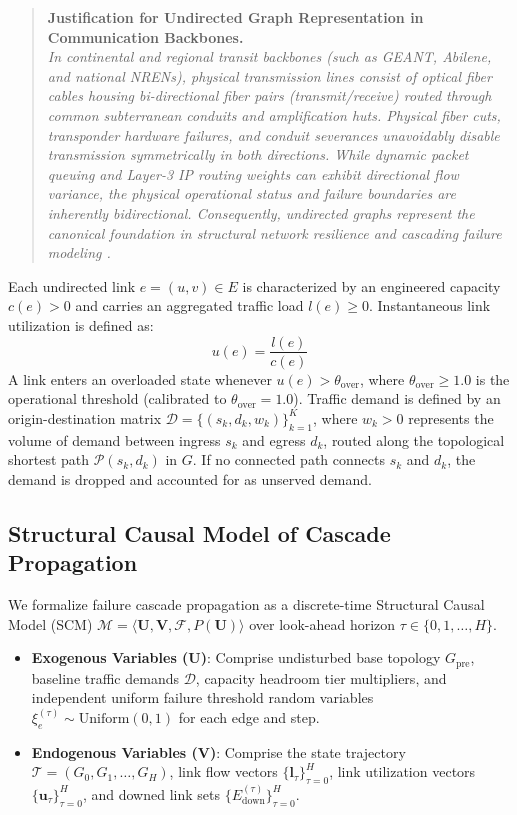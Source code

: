 \documentclass[pdflatex,sn-mathphys-num]{sn-jnl}
\theoremstyle{thmstyleone}
\theoremstyle{thmstyletwo}
\theoremstyle{thmstylethree}
\begin{document}
\begin{quote}
\textbf{Justification for Undirected Graph Representation in Communication Backbones.}\\
\textit{In continental and regional transit backbones (such as GEANT, Abilene, and national NRENs), physical transmission lines consist of optical fiber cables housing bi-directional fiber pairs (transmit/receive) routed through common subterranean conduits and amplification huts. Physical fiber cuts, transponder hardware failures, and conduit severances unavoidably disable transmission symmetrically in both directions. While dynamic packet queuing and Layer-3 IP routing weights can exhibit directional flow variance, the physical operational status and failure boundaries are inherently bidirectional. Consequently, undirected graphs represent the canonical foundation in structural network resilience and cascading failure modeling \cite{albert2000error,motter2002cascade,crucitti2004model}.}
\end{quote}

Each undirected link $e = (u, v) \in E$ is characterized by an engineered capacity $c(e) > 0$ and carries an aggregated traffic load $l(e) \ge 0$. Instantaneous link utilization is defined as:
\begin{equation}
u(e) = \frac{l(e)}{c(e)}
\end{equation}
A link enters an overloaded state whenever $u(e) > \theta_{\mathrm{over}}$, where $\theta_{\mathrm{over}} \ge 1.0$ is the operational threshold (calibrated to $\theta_{\mathrm{over}} = 1.0$). Traffic demand is defined by an origin-destination matrix $\mathcal{D} = \{(s_k, d_k, w_k)\}_{k=1}^K$, where $w_k > 0$ represents the volume of demand between ingress $s_k$ and egress $d_k$, routed along the topological shortest path $\mathcal{P}(s_k, d_k)$ in $G$. If no connected path connects $s_k$ and $d_k$, the demand is dropped and accounted for as unserved demand.

\subsection{Structural Causal Model of Cascade Propagation}
We formalize failure cascade propagation as a discrete-time Structural Causal Model (SCM) \cite{pearl2009causality,spirtes2000causation} $\mathcal{M} = \langle \mathbf{U}, \mathbf{V}, \mathcal{F}, P(\mathbf{U}) \rangle$ over look-ahead horizon $\tau \in \{0, 1, \dots, H\}$.
\begin{itemize}
    \item \textbf{Exogenous Variables ($\mathbf{U}$)}: Comprise undisturbed base topology $G_{\mathrm{pre}}$, baseline traffic demands $\mathcal{D}$, capacity headroom tier multipliers, and independent uniform failure threshold random variables $\xi_e^{(\tau)} \sim \mathrm{Uniform}(0, 1)$ for each edge and step.
    \item \textbf{Endogenous Variables ($\mathbf{V}$)}: Comprise the state trajectory $\mathcal{T} = (G_0, G_1, \dots, G_H)$, link flow vectors $\{\mathbf{l}_\tau\}_{\tau=0}^H$, link utilization vectors $\{\mathbf{u}_\tau\}_{\tau=0}^H$, and downed link sets $\{E_{\mathrm{down}}^{(\tau)}\}_{\tau=0}^H$.
\end{itemize}
\end{document}
